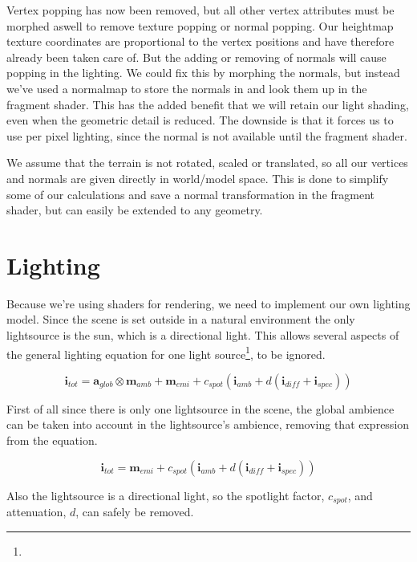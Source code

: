 
Vertex popping has now been removed, but all other vertex attributes
must be morphed aswell to remove texture popping or normal
popping. Our heightmap texture coordinates are proportional to the
vertex positions and have therefore already been taken care of. But
the adding or removing of normals will cause popping in the
lighting. We could fix this by morphing the normals, but instead we've
used a normalmap to store the normals in and look them up in the
fragment shader. This has the added benefit that we will retain our
light shading, even when the geometric detail is reduced. The downside
is that it forces us to use per pixel lighting, since the normal is
not available until the fragment shader.

We assume that the terrain is not rotated, scaled or translated, so
all our vertices and normals are given directly in world/model
space. This is done to simplify some of our calculations and save a
normal transformation in the fragment shader, but can easily be
extended to any geometry.

\section{Lighting}

Because we're using shaders for rendering, we need to implement our
own lighting model. Since the scene is set outside in a natural
environment the only lightsource is the sun, which is a directional
light. This allows several aspects of the general lighting equation
for one light source\footnote{}, to be
ignored.

\begin{displaymath}
  \mathbf{i}_{tot} = \mathbf{a}_{glob} \otimes \mathbf{m}_{amb} +
  \mathbf{m}_{emi} + c_{spot}(\mathbf{i}_{amb} + d(\mathbf{i}_{diff} + \mathbf{i}_{spec}))
\end{displaymath}

First of all since there is only one lightsource in the scene, the
global ambience can be taken into account in the lightsource's
ambience, removing that expression from the equation.

\begin{displaymath}
  \mathbf{i}_{tot} = \mathbf{m}_{emi} + c_{spot}(\mathbf{i}_{amb} + d(\mathbf{i}_{diff} + \mathbf{i}_{spec}))
\end{displaymath}

Also the lightsource is a directional light, so the spotlight factor,
$c_{spot}$, and attenuation, $d$, can safely be removed.

